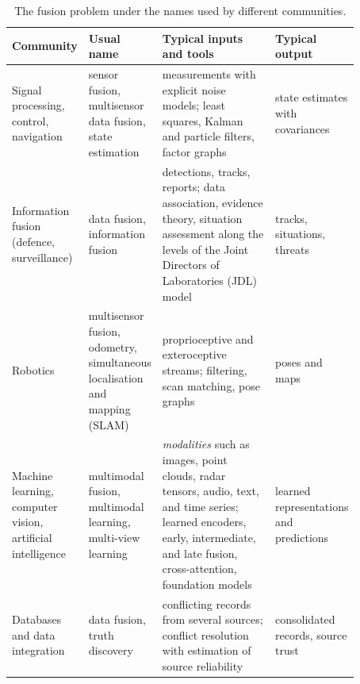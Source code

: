 \documentclass[graybox,envcountchap]{style/SNmono}
\begin{document}
\begin{table}[!t]
    \centering
    \renewcommand{\arraystretch}{1.25}
    \footnotesize
    \setlength{\tabcolsep}{4pt}
    \caption{The fusion problem under the names used by different communities.}
    \label{tab:fusion-terminology}
    \begin{tabular}{>{\raggedright\arraybackslash}p{0.17\linewidth} >{\raggedright\arraybackslash}p{0.19\linewidth} >{\raggedright\arraybackslash}p{0.33\linewidth} >{\raggedright\arraybackslash}p{0.18\linewidth}}
        \hline
        \textbf{Community} & \textbf{Usual name} & \textbf{Typical inputs and tools} & \textbf{Typical output} \\
        \hline
        Signal processing, control, navigation & sensor fusion, multisensor data fusion, state estimation & measurements with explicit noise models; least squares, Kalman and particle filters, factor graphs \cite{barshalom2001_estimation,sarkka2013_bayesian} & state estimates with covariances \\
        Information fusion (defence, surveillance) & data fusion, information fusion & detections, tracks, reports; data association, evidence theory, situation assessment along the levels of the Joint Directors of Laboratories (JDL) model \cite{hall_introduction_1997,steinberg1999_jdl,liggins_handbook_2009} & tracks, situations, threats \\
        Robotics & multisensor fusion, odometry, simultaneous localisation and mapping (SLAM) & proprioceptive and exteroceptive streams; filtering, scan matching, pose graphs \cite{thrun_probabilistic_2005} & poses and maps \\
        Machine learning, computer vision, artificial intelligence & multimodal fusion, multimodal learning, multi-view learning & \emph{modalities} such as images, point clouds, radar tensors, audio, text, and time series; learned encoders, early, intermediate, and late fusion, cross-attention, foundation models \cite{atrey_multimodal_2010,baltrusaitis_multimodal_2019,gao_survey_2020} & learned representations and predictions \\
        Databases and data integration & data fusion, truth discovery & conflicting records from several sources; conflict resolution with estimation of source reliability \cite{bleiholder2009_datafusion,li2016_truthdiscovery} & consolidated records, source trust \\
        \hline
    \end{tabular}
\end{table}
\end{document}
